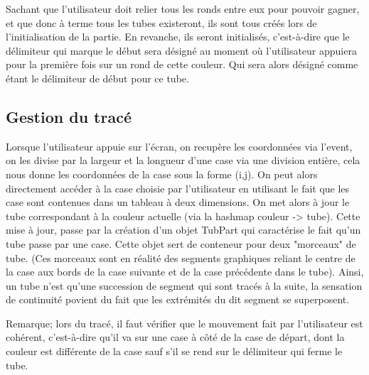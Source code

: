 \documentclass[12pt, a4paper]{article}%
\begin{document}
    Sachant que l'utilisateur doit relier tous les ronds entre eux pour pouvoir gagner, et que donc à terme tous les tubes
    existeront, ils sont tous créés lors de l'initialisation de la partie. En revanche, ils seront initialisés, c'est-à-dire que
    le délimiteur qui marque le début sera désigné au moment où l'utilisateur appuiera pour la première fois sur un rond de cette
    couleur. Qui sera alors désigné comme étant le délimiteur de début pour ce tube.
    \subsection{Gestion du tracé}
    Lorsque l'utilisateur appuie sur l'écran, on recupère les coordonnées via l'event, on les divise par la largeur et la longueur
    d'une case via une division entière, cela nous donne les coordonnées de la case sous la forme (i,j). On peut alors directement
    accéder à la case choisie par l'utilisateur en utilisant le fait que les case sont contenues dans un tableau à deux
    dimensions. On met alors à jour le tube correspondant à la couleur actuelle (via la hashmap couleur -> tube). Cette mise à
    jour, passe par la création d'un objet TubPart qui caractérise le fait qu'un tube passe par une case. Cette objet sert de
    conteneur pour deux "morceaux" de tube. (Ces morceaux sont en réalité des segments graphiques reliant le centre de la case aux
    bords de la case suivante et de la case précédente dans le tube). Ainsi, un tube n'est qu'une succession de segment qui sont
    tracés à la suite, la sensation de continuité povient du fait que les extrémités du dit segment se superposent.
    \newline

    Remarque; lors du tracé, il faut vérifier que le mouvement fait par l'utilisateur est cohérent, c'est-à-dire qu'il va sur une
    case à côté de la case de départ, dont la couleur est différente de la case sauf s'il se rend sur le délimiteur qui ferme le
    tube.
\end{document}
